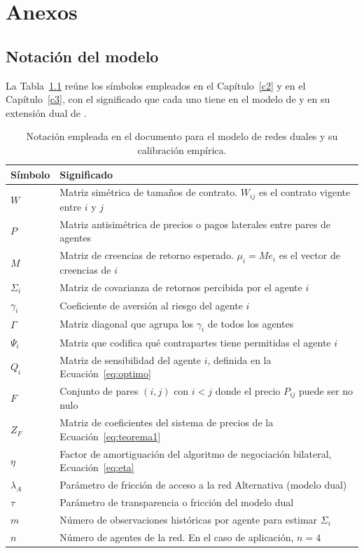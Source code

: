 
\chapter{Anexos}
\label{anexos}

\section{Notación del modelo}
\label{anexo:notacion}

La Tabla~\ref{tab:notacion} reúne los símbolos empleados en el Capítulo~\ref{c2}
y en el Capítulo~\ref{c3}, con el significado que cada uno tiene en el modelo de
 y en su extensión dual de
.

\begin{table}[htbp]
\centering
\caption[Notación del modelo de redes duales]{Notación empleada en el documento para el modelo de redes duales y su calibración empírica.}
\label{tab:notacion}
\small
\begin{tabular}{ll}
\hline
Símbolo & Significado \\
\hline
$W$ & Matriz simétrica de tamaños de contrato. $W_{ij}$ es el contrato vigente entre $i$ y $j$ \\
$P$ & Matriz antisimétrica de precios o pagos laterales entre pares de agentes \\
$M$ & Matriz de creencias de retorno esperado. $\mu_i = Me_i$ es el vector de creencias de $i$ \\
$\Sigma_i$ & Matriz de covarianza de retornos percibida por el agente $i$ \\
$\gamma_i$ & Coeficiente de aversión al riesgo del agente $i$ \\
$\Gamma$ & Matriz diagonal que agrupa los $\gamma_i$ de todos los agentes \\
$\Psi_i$ & Matriz que codifica qué contrapartes tiene permitidas el agente $i$ \\
$Q_i$ & Matriz de sensibilidad del agente $i$, definida en la Ecuación~\eqref{eq:optimo} \\
$F$ & Conjunto de pares $(i,j)$ con $i<j$ donde el precio $P_{ij}$ puede ser no nulo \\
$Z_F$ & Matriz de coeficientes del sistema de precios de la Ecuación~\eqref{eq:teorema1} \\
$\eta$ & Factor de amortiguación del algoritmo de negociación bilateral, Ecuación~\eqref{eq:eta} \\
$\lambda_A$ & Parámetro de fricción de acceso a la red Alternativa (modelo dual) \\
$\tau$ & Parámetro de transparencia o fricción del modelo dual \\
$m$ & Número de observaciones históricas por agente para estimar $\Sigma_i$ \\
$n$ & Número de agentes de la red. En el caso de aplicación, $n=4$ \\
\hline
\end{tabular}
\end{table}

